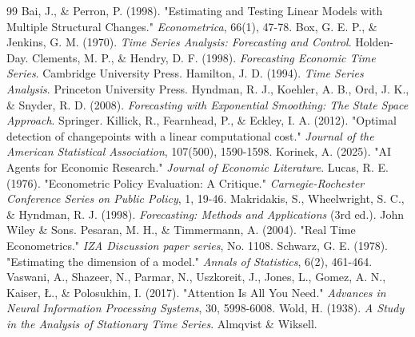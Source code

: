 \documentclass[11pt]{report}
\begin{document}


\begin{thebibliography}{99}
 Bai, J., \& Perron, P. (1998). "Estimating and Testing Linear Models with Multiple Structural Changes." \textit{Econometrica}, 66(1), 47-78.
 Box, G. E. P., \& Jenkins, G. M. (1970). \textit{Time Series Analysis: Forecasting and Control}. Holden-Day.
 Clements, M. P., \& Hendry, D. F. (1998). \textit{Forecasting Economic Time Series}. Cambridge University Press.
 Hamilton, J. D. (1994). \textit{Time Series Analysis}. Princeton University Press.
 Hyndman, R. J., Koehler, A. B., Ord, J. K., \& Snyder, R. D. (2008). \textit{Forecasting with Exponential Smoothing: The State Space Approach}. Springer.
 Killick, R., Fearnhead, P., \& Eckley, I. A. (2012). "Optimal detection of changepoints with a linear computational cost." \textit{Journal of the American Statistical Association}, 107(500), 1590-1598.
 Korinek, A. (2025). "AI Agents for Economic Research." \textit{Journal of Economic Literature}.
 Lucas, R. E. (1976). "Econometric Policy Evaluation: A Critique." \textit{Carnegie-Rochester Conference Series on Public Policy}, 1, 19-46.
 Makridakis, S., Wheelwright, S. C., \& Hyndman, R. J. (1998). \textit{Forecasting: Methods and Applications} (3rd ed.). John Wiley \& Sons.
 Pesaran, M. H., \& Timmermann, A. (2004). "Real Time Econometrics." \textit{IZA Discussion paper series}, No. 1108.
 Schwarz, G. E. (1978). "Estimating the dimension of a model." \textit{Annals of Statistics}, 6(2), 461-464.
 Vaswani, A., Shazeer, N., Parmar, N., Uszkoreit, J., Jones, L., Gomez, A. N., Kaiser, \L., \& Polosukhin, I. (2017). "Attention Is All You Need." \textit{Advances in Neural Information Processing Systems}, 30, 5998-6008.
 Wold, H. (1938). \textit{A Study in the Analysis of Stationary Time Series}. Almqvist \& Wiksell.
\end{thebibliography}
\end{document}
